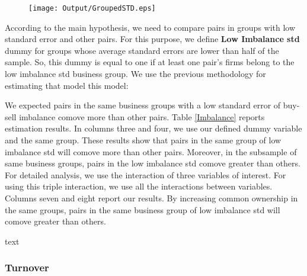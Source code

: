 \documentclass[12pt, a4paper]{article}
\begin{document}
\begin{table}[htbp]
	\centering
	\resizebox{0.75\textwidth}{!}{
		
	}
	\label{tab:ImbalanceSummary}%
\end{table}%
\begin{figure}[htbp]
	\centering
	\texttt{[image: Output/GroupedSTD.eps]}
	\label{fig:GroupedSTD}
\end{figure}

According to the main hypothesis, we need to compare pairs in groups with low standard error and other pairs.
For this purpose, we define \textbf{Low Imbalance std} dummy for groups whose average standard errors are lower than half of the sample. 
So, this dummy is equal to one if at least one pair's firms belong to the low imbalance std business group.  We use the previous methodology for estimating that model this model:


We expected pairs in the same business groups with a low standard error of buy-sell imbalance comove more than other pairs. Table \ref{Imbalance} reports estimation results. In columns three and four, we use our defined dummy variable and the same group. These results show that pairs in the same group of low imbalance std will comove more than other pairs. Moreover, in the subsample of same business groups, pairs in the low imbalance std comove greater than others.  For detailed analysis, we use the interaction of three variables of interest. For using this triple interaction, we use all the interactions between variables. Columns seven and eight report our results. By increasing common ownership in the same groups, pairs in the same business group of low imbalance std will comove greater than others.
\begin{table}[htbp]
	\centering
	\caption{text}
	\label{Imbalance}
	\resizebox{\textwidth}{!}{
		
	}
\end{table}
\FloatBarrier

 \subsubsection{Turnover}
\end{document}
